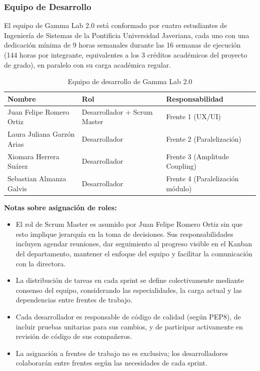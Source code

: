 \documentclass{article}
\begin{document}
\subsubsection{Equipo de Desarrollo}

El equipo de Gamma Lab 2.0 está conformado por cuatro estudiantes de Ingeniería de Sistemas de la Pontificia Universidad Javeriana, cada uno con una dedicación mínima de 9 horas semanales durante las 16 semanas de ejecución (144 horas por integrante, equivalentes a los 3 créditos académicos del proyecto de grado), en paralelo con su carga académica regular.

\begin{table}[H]
\centering
\small
\begin{tabular}{|p{2.8cm}|p{2.5cm}|p{2.5cm}|}
\hline
\textbf{Nombre} & \textbf{Rol} & \textbf{Responsabilidad} \\
\hline
Juan Felipe Romero Ortiz & Desarrollador + Scrum Master & Frente 1 (UX/UI) \\
\hline
Laura Juliana Garzón Arias & Desarrollador & Frente 2 (Paralelización) \\
\hline
Xiomara Herrera Suárez & Desarrollador & Frente 3 (Amplitude Coupling) \\
\hline
Sebastian Almanza Galvis & Desarrollador & Frente 4 (Paralelización módulo) \\
\hline
\end{tabular}
\caption{Equipo de desarrollo de Gamma Lab 2.0}
\label{tab:equipo}
\end{table}

\textbf{Notas sobre asignación de roles:}

\begin{itemize}
    \item El rol de Scrum Master es asumido por Juan Felipe Romero Ortiz sin que esto implique jerarquía en la toma de decisiones. Sus responsabilidades incluyen agendar reuniones, dar seguimiento al progreso visible en el Kanban del departamento, mantener el enfoque del equipo y facilitar la comunicación con la directora.
    
    \item La distribución de tareas en cada sprint se define colectivamente mediante consenso del equipo, considerando las especialidades, la carga actual y las dependencias entre frentes de trabajo.
    
    \item Cada desarrollador es responsable de código de calidad (según PEP8), de incluir pruebas unitarias para sus cambios, y de participar activamente en revisión de código de sus compañeros.
    
    \item La asignación a frentes de trabajo no es exclusiva; los desarrolladores colaborarán entre frentes según las necesidades de cada sprint.
\end{itemize}
\end{document}
